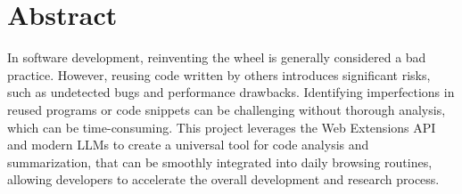 \section*{Abstract}

In software development, reinventing the wheel is generally considered a bad
practice. However, reusing code written by others introduces significant risks,
such as undetected bugs and performance drawbacks. Identifying imperfections in
reused programs or code snippets can be challenging without thorough analysis,
which can be time-consuming. This project leverages the Web Extensions API and
modern LLMs to create a universal tool for code analysis and summarization,
that can be smoothly integrated into daily browsing routines, allowing
developers to accelerate the overall development and research process.

